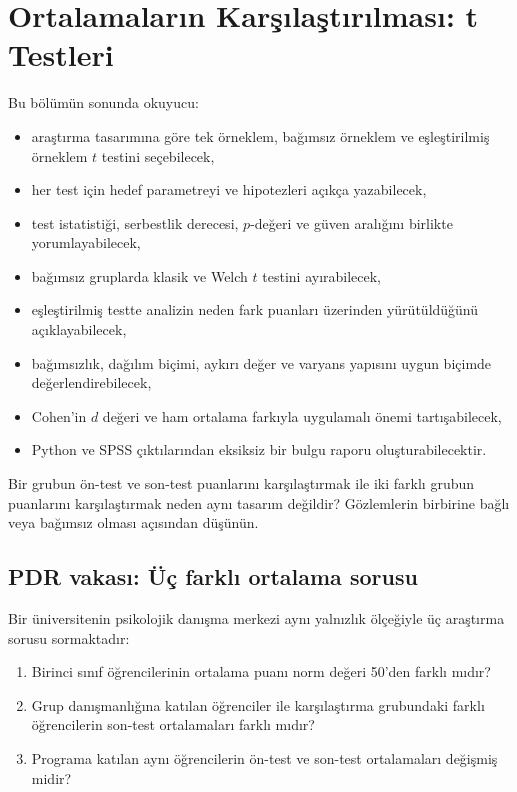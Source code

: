 \chapter{Ortalamaların Karşılaştırılması: t Testleri}

\begin{hedefler}
Bu bölümün sonunda okuyucu:
\begin{itemize}
  \item araştırma tasarımına göre tek örneklem, bağımsız örneklem ve eşleştirilmiş örneklem $t$ testini seçebilecek,
  \item her test için hedef parametreyi ve hipotezleri açıkça yazabilecek,
  \item test istatistiği, serbestlik derecesi, $p$-değeri ve güven aralığını birlikte yorumlayabilecek,
  \item bağımsız gruplarda klasik ve Welch $t$ testini ayırabilecek,
  \item eşleştirilmiş testte analizin neden fark puanları üzerinden yürütüldüğünü açıklayabilecek,
  \item bağımsızlık, dağılım biçimi, aykırı değer ve varyans yapısını uygun biçimde değerlendirebilecek,
  \item Cohen'in $d$ değeri ve ham ortalama farkıyla uygulamalı önemi tartışabilecek,
  \item Python ve SPSS çıktılarından eksiksiz bir bulgu raporu oluşturabilecektir.
\end{itemize}
\end{hedefler}

\begin{hazirlik}
Bir grubun ön-test ve son-test puanlarını karşılaştırmak ile iki farklı grubun
puanlarını karşılaştırmak neden aynı tasarım değildir? Gözlemlerin birbirine
bağlı veya bağımsız olması açısından düşünün.
\end{hazirlik}

\section{PDR vakası: Üç farklı ortalama sorusu}

Bir üniversitenin psikolojik danışma merkezi aynı yalnızlık ölçeğiyle üç
araştırma sorusu sormaktadır:

\begin{enumerate}
  \item Birinci sınıf öğrencilerinin ortalama puanı norm değeri 50'den farklı mıdır?
  \item Grup danışmanlığına katılan öğrenciler ile karşılaştırma grubundaki farklı öğrencilerin son-test ortalamaları farklı mıdır?
  \item Programa katılan aynı öğrencilerin ön-test ve son-test ortalamaları değişmiş midir?
\end{enumerate}

